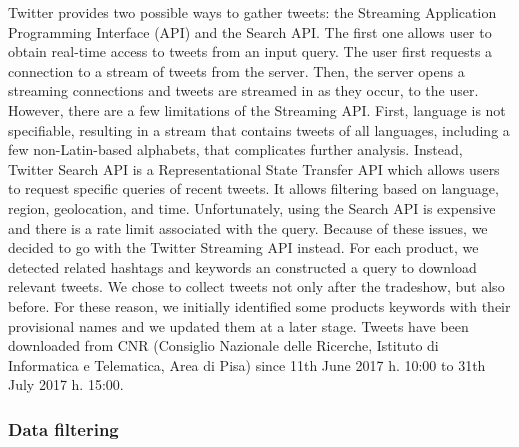 \documentclass[]{book}
\begin{document}
Twitter provides two possible ways to gather tweets: the Streaming
Application Programming Interface (API) and the Search API. The first
one allows user to obtain real-time access to tweets from an input
query. The user first requests a connection to a stream of tweets from
the server. Then, the server opens a streaming connections and tweets
are streamed in as they occur, to the user. However, there are a few
limitations of the Streaming API. First, language is not specifiable,
resulting in a stream that contains tweets of all languages, including a
few non-Latin-based alphabets, that complicates further analysis.
Instead, Twitter Search API is a Representational State Transfer API
which allows users to request specific queries of recent tweets. It
allows filtering based on language, region, geolocation, and time.
Unfortunately, using the Search API is expensive and there is a rate
limit associated with the query. Because of these issues, we decided to
go with the Twitter Streaming API instead. For each product, we detected
related hashtags and keywords an constructed a query to download
relevant tweets. We chose to collect tweets not only after the
tradeshow, but also before. For these reason, we initially identified
some products keywords with their provisional names and we updated them
at a later stage. Tweets have been downloaded from CNR (Consiglio
Nazionale delle Ricerche, Istituto di Informatica e Telematica, Area di
Pisa) since 11th June 2017 h. 10:00 to 31th July 2017 h. 15:00.

\subsubsection*{Data filtering}\label{data-filtering}
\end{document}
